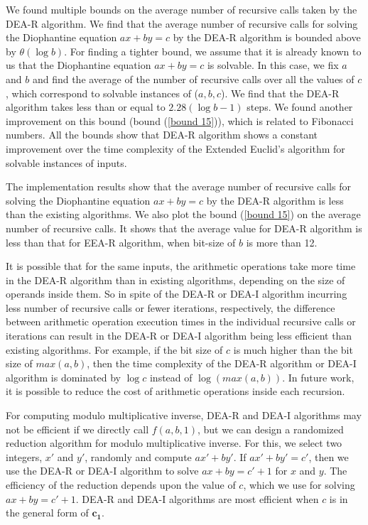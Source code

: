 \documentclass[pdflatex,sn-mathphys-num]{sn-jnl}%
\theoremstyle{thmstyleone}%
\theoremstyle{thmstyletwo}%
\theoremstyle{thmstylethree}%
\begin{document}
 \par We found multiple bounds on the average number of recursive calls taken by the DEA-R algorithm. We find that the average number of recursive calls for solving the Diophantine equation $ax+by=c$ by the DEA-R algorithm is bounded above by $\theta(\log b)$. For finding a tighter bound, we assume that it is already known to us that the Diophantine equation $ax+by=c$ is solvable. In this case, we fix $a$ and $b$ and find the average of the number of recursive calls over all the values of $c$, which correspond to solvable instances of ($a,b,c$). We find that the DEA-R algorithm takes less than or equal to $2.28 (\log b-1)$ steps. We found another improvement on this bound (bound (\ref{bound 15})), which is related to Fibonacci numbers. All the bounds show that DEA-R algorithm shows a constant improvement over the time complexity of the Extended Euclid's algorithm for solvable instances of inputs.  
 \par The implementation results show that the average number of recursive calls for solving the Diophantine equation $ax+by=c$ by the DEA-R algorithm is less than the existing algorithms. We also plot the bound (\ref{bound 15}) on the average number of recursive calls. It shows that the average value for DEA-R algorithm is less than that for EEA-R algorithm, when bit-size of $b$ is more than 12.  
 \par  It is possible that for the same inputs, the arithmetic operations take more time in the DEA-R algorithm than in existing algorithms, depending on the size of operands inside them. So in spite of the DEA-R or DEA-I algorithm incurring less number of recursive calls or fewer iterations, respectively, the difference between arithmetic operation execution times in the individual recursive calls or iterations can result in the DEA-R or DEA-I algorithm being less efficient than existing algorithms. For example, if the bit size of $c$ is much higher than the bit size of $max(a,b)$, then the time complexity of the DEA-R algorithm or DEA-I algorithm is dominated by $\log c$ instead of $\log(max(a,b))$. In future work, it is possible to reduce the cost of arithmetic operations inside each recursion.     
 \par For computing modulo multiplicative inverse, DEA-R and DEA-I algorithms may not be efficient if we directly call $f(a,b,1)$, but we can design a randomized reduction algorithm for modulo multiplicative inverse. For this, we select two integers, $x'$ and $y'$, randomly and compute $ax'+by'$. If $ax'+by'=c'$, then we use the DEA-R or DEA-I algorithm to solve $ax+by=c'+1$ for $x$ and $y$. The efficiency of the reduction depends upon the value of $c$, which we use for solving $ax+by=c'+1$.  DEA-R and DEA-I algorithms are most efficient when $c$ is in the general form of $\mathbf{c_1}$. 
 
\end{document}
